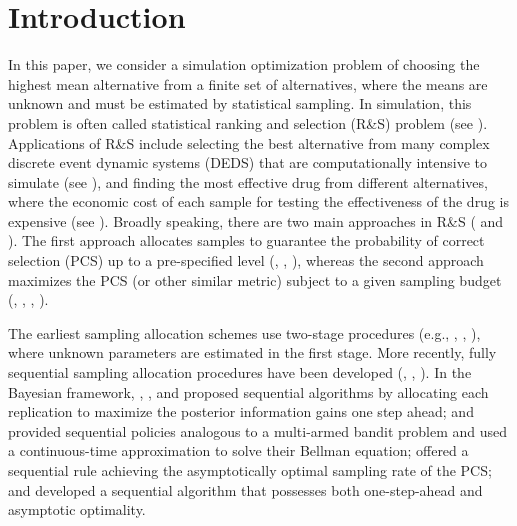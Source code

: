 \documentclass[journal]{IEEEtran}
\begin{document}
%
\IEEEpeerreviewmaketitle



\section{Introduction}
In this paper, we consider a simulation optimization problem of choosing the highest mean alternative from a finite set of alternatives, where the means are unknown and must be estimated by statistical sampling. In simulation, this problem is often called statistical ranking and selection (R\&S) problem (see \cite{BSG95}). Applications of R\&S include selecting the best alternative from many complex discrete event dynamic systems (DEDS) that are computationally intensive to simulate (see \cite{qing2013stochastic}), and finding the most effective drug from different alternatives, where the economic cost of each sample for testing the effectiveness of the drug is expensive (see \cite{powell2012ranking}). 
Broadly speaking, there are two main approaches in R\&S (\cite{goldsman1998comparing} and \cite{chen2011stochastic}). The first approach allocates samples to guarantee the probability of correct selection (PCS) up to a pre-specified level (\cite{rinott1978two}, \cite{kim2006selecting}, \cite{kim2013statistic}), whereas the second approach maximizes the PCS (or other similar metric) subject to a given sampling budget (\cite{chen2000simulation}, \cite{chick2001new},  \cite{lee2012approximate},  \cite{pasupathy2014stochastically}). 

The earliest sampling allocation schemes use two-stage procedures (e.g., \cite{rinott1978two}, \cite{chen2000simulation}, \cite{chick2001new}), where unknown parameters are estimated in the first stage. More recently, fully sequential sampling allocation procedures have been developed (\cite{kim2001fully}, \cite{hong2005tradeoff}, \cite{frazier2014fully}).  
 In the Bayesian framework, \cite{chen2006efficient}, \cite{frazier2008knowledge}, and \cite{chick2010sequential} proposed sequential algorithms  by allocating each replication to maximize the posterior information gains one step ahead; \cite{chick2009economic} and \cite{chick2012sequential} provided sequential policies analogous to a multi-armed bandit problem and used a continuous-time approximation to solve their Bellman equation; \cite{peng2014dynamic} offered a sequential rule achieving the asymptotically optimal sampling rate of the PCS; and \cite{peng2015asymptotic} developed a sequential algorithm that possesses both one-step-ahead and asymptotic optimality. 
\end{document}
